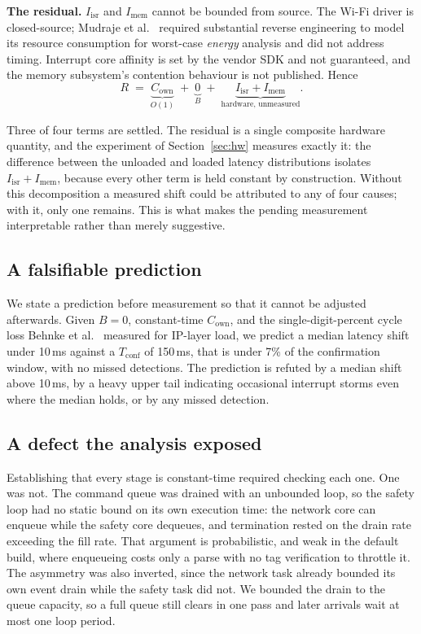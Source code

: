 \textbf{The residual.} $I_{\mathrm{isr}}$ and $I_{\mathrm{mem}}$ cannot be bounded from source.
The Wi-Fi driver is closed-source; Mudraje et al.~\cite{esp32c3re2025} required substantial
reverse engineering to model its resource consumption for worst-case \emph{energy} analysis and
did not address timing. Interrupt core affinity is set by the vendor SDK and not guaranteed, and
the memory subsystem's contention behaviour is not published. Hence
\begin{equation}
R \;=\; \underbrace{C_{\mathrm{own}}}_{O(1)} \;+\; \underbrace{0}_{B} \;+\;
\underbrace{I_{\mathrm{isr}} + I_{\mathrm{mem}}}_{\text{hardware, unmeasured}} .
\label{eq:residual}
\end{equation}

Three of four terms are settled. The residual is a single composite hardware quantity, and the
experiment of Section~\ref{sec:hw} measures exactly it: the difference between the unloaded and
loaded latency distributions isolates $I_{\mathrm{isr}} + I_{\mathrm{mem}}$, because every other
term is held constant by construction. Without this decomposition a measured shift could be
attributed to any of four causes; with it, only one remains. This is what makes the pending
measurement interpretable rather than merely suggestive.

\subsection{A falsifiable prediction}

We state a prediction before measurement so that it cannot be adjusted afterwards. Given $B = 0$,
constant-time $C_{\mathrm{own}}$, and the single-digit-percent cycle loss Behnke
et al.~\cite{behnke2020} measured for IP-layer load, we predict a median latency shift under
10\,ms against a $T_{\mathrm{conf}}$ of 150\,ms, that is under 7\% of the confirmation window,
with no missed detections. The prediction is refuted by a median shift above 10\,ms, by a heavy
upper tail indicating occasional interrupt storms even where the median holds, or by any missed
detection.

\subsection{A defect the analysis exposed}

Establishing that every stage is constant-time required checking each one. One was not. The
command queue was drained with an unbounded loop, so the safety loop had no static bound on its
own execution time: the network core can enqueue while the safety core dequeues, and termination
rested on the drain rate exceeding the fill rate. That argument is probabilistic, and weak in the
default build, where enqueueing costs only a parse with no tag verification to throttle it. The
asymmetry was also inverted, since the network task already bounded its own event drain while the
safety task did not. We bounded the drain to the queue capacity, so a full queue still clears in
one pass and later arrivals wait at most one loop period.

